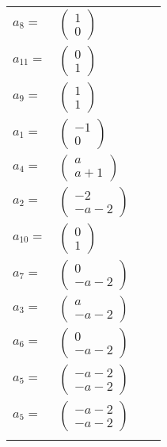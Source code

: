 \documentclass[1p]{elsarticle_modified}
\theoremstyle{definition}
\begin{document}
\begin{tabular}{m{7pt} m{180pt} m{7pt} m{180pt} }
\flushright $a_{8}=$&$\begin{pmatrix}1\\0\end{pmatrix}$ \\
\flushright $a_{11}=$&$\begin{pmatrix}0\\1\end{pmatrix}$ \\
\flushright $a_{9}=$&$\begin{pmatrix}1\\1\end{pmatrix}$ \\
\flushright $a_{1}=$&$\begin{pmatrix}-1\\0\end{pmatrix}$ \\
\flushright $a_{4}=$&$\begin{pmatrix}a\\a+1\end{pmatrix}$ \\
\flushright $a_{2}=$&$\begin{pmatrix}-2\\- a-2\end{pmatrix}$ \\
\flushright $a_{10}=$&$\begin{pmatrix}0\\1\end{pmatrix}$ \\
\flushright $a_{7}=$&$\begin{pmatrix}0\\- a-2\end{pmatrix}$ \\
\flushright $a_{3}=$&$\begin{pmatrix}a\\- a-2\end{pmatrix}$ \\
\flushright $a_{6}=$&$\begin{pmatrix}0\\- a-2\end{pmatrix}$ \\
\flushright $a_{5}=$&$\begin{pmatrix}- a-2\\- a-2\end{pmatrix}$\\ \flushright $a_{5}=$&$\begin{pmatrix}- a-2\\- a-2\end{pmatrix}$\\&\end{tabular}
\end{document}
